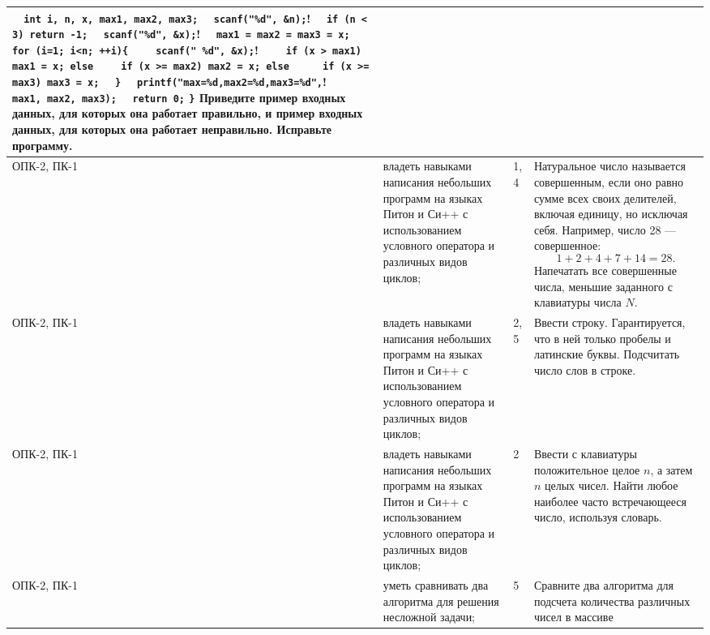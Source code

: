 \documentclass[a4paper,12pt]{article}
\begin{document}
\begin{longtable}{|p{15mm}|p{42mm}|p{17mm}|p{70mm}|}
\verb!  int i, n, x, max1, max2, max3;!\newline
\verb!  scanf("%d", &n);!\newline
\verb!  if (n < 3) return -1;!\newline
\verb!  scanf("%d", &x);!\newline
\verb!  max1 = max2 = max3 = x;!\newline
\verb!  for (i=1; i<n; ++i){!\newline
\verb!    scanf(" %d", &x);!\newline
\verb!    if (x > max1) max1 = x; else!\newline
\verb!    if (x >= max2) max2 = x; else !\newline
\verb!    if (x >= max3) max3 = x;!\newline
\verb!  }!\newline
\verb!  printf("max=%d,max2=%d,max3=%d",!\newline
\verb!         max1, max2, max3);!\newline
\verb!  return 0;!\newline
\verb!}!\newline
Приведите пример входных данных, для которых она работает правильно,
и пример входных данных, для которых она работает неправильно. Исправьте программу. 
\\
\hline
ОПК-2, ПК-1 & 
владеть навыками написания небольших программ на языках Питон и Си++ с использованием условного оператора и различных видов циклов; & 
1, 4 & 
Натуральное число называется совершенным, если оно равно сумме всех своих делителей, включая единицу, но исключая себя. Например, число 28 --- совершенное: \[1 + 2 + 4 + 7 + 14 = 28.\] Напечатать все совершенные числа, меньшие заданного с клавиатуры числа $N$. 
\\
\hline
ОПК-2, ПК-1 & 
владеть навыками написания небольших программ на языках Питон и Си++ с использованием условного оператора и различных видов циклов; & 
2, 5 & 
Ввести строку. Гарантируется, что в ней только пробелы и латинские буквы. Подсчитать число слов в строке. 
\\
\hline
ОПК-2, ПК-1 & 
владеть навыками написания небольших программ на языках Питон и Си++ с использованием условного оператора и различных видов циклов; & 
2 & 
Ввести с клавиатуры положительное целое $n$, а затем $n$ целых чисел. Найти любое наиболее часто встречающееся число, используя словарь. 
\\
\hline
ОПК-2, ПК-1 & 
уметь сравнивать два алгоритма для решения несложной задачи; & 
5 & 
Сравните два алгоритма для подсчета количества различных чисел в массиве

\end{longtable}
\end{document}
